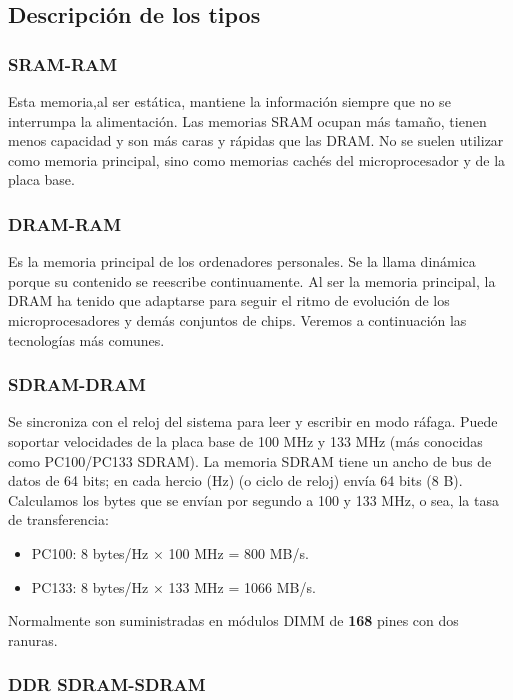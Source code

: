\documentclass[11pt]{article}
\begin{document}
\subsection{Descripción de los tipos}
\label{sec:org3baeab9}

\subsubsection{SRAM-RAM}
\label{sec:org9eb7a27}

Esta memoria,al ser estática, mantiene la información siempre que no se interrumpa
la alimentación. Las memorias SRAM ocupan más tamaño, tienen
menos capacidad y son más caras y rápidas que las DRAM. No se
suelen utilizar como memoria principal, sino como memorias cachés
del microprocesador y de la placa base.

\subsubsection{DRAM-RAM}
\label{sec:org6ba5aa8}

Es la memoria principal de los ordenadores personales. Se la llama
dinámica porque su contenido se reescribe continuamente.
Al ser la memoria principal, la DRAM ha tenido que adaptarse
para seguir el ritmo de evolución de los microprocesadores y demás
conjuntos de chips. Veremos a continuación las tecnologías más
comunes.

\subsubsection{SDRAM-DRAM}
\label{sec:org4fe70d2}
Se sincroniza con el reloj del sistema para leer y escribir en   modo ráfaga. 
Puede soportar velocidades de la placa base de 100 MHz y 133 MHz (más
conocidas como PC100/PC133 SDRAM).
La memoria SDRAM tiene un ancho de bus de datos de 64 bits; en
cada hercio (Hz) (o ciclo de reloj) envía 64 bits (8 B). Calculamos los
bytes que se envían por segundo a 100 y 133 MHz, o sea, la tasa
de transferencia:

\begin{itemize}
\item PC100: 8 bytes/Hz × 100 MHz = 800 MB/s.
\item PC133: 8 bytes/Hz × 133 MHz = 1066 MB/s.
\end{itemize}

Normalmente son suministradas en módulos DIMM de \textbf{168} pines con
dos ranuras.

\subsubsection{DDR SDRAM-SDRAM}
\label{sec:org0d8d98a}
\end{document}
